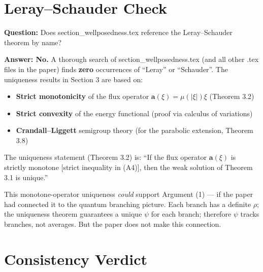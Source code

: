 \documentclass[11pt,a4paper]{article}
\begin{document}
\section{Leray--Schauder Check}

\textbf{Question:} Does section\_wellposedness.tex reference the
Leray--Schauder theorem by name?

\textbf{Answer: No.} A thorough search of section\_wellposedness.tex
(and all other .tex files in the paper) finds \textbf{zero} occurrences
of ``Leray'' or ``Schauder''. The uniqueness results in Section 3 are
based on:
\begin{itemize}
\item \textbf{Strict monotonicity} of the flux operator
$\mathbf{a}(\xi) = \mu(|\xi|)\xi$ (Theorem 3.2)
\item \textbf{Strict convexity} of the energy functional (proof via
calculus of variations)
\item \textbf{Crandall--Liggett} semigroup theory (for the parabolic
extension, Theorem 3.8)
\end{itemize}

The uniqueness statement (Theorem 3.2) is: ``If the flux operator
$\mathbf{a}(\xi)$ is strictly monotone [strict inequality in (A4)],
then the weak solution of Theorem 3.1 is unique.''

This monotone-operator uniqueness \emph{could} support Argument (1)
--- if the paper had connected it to the quantum branching picture.
Each branch has a definite $\rho$; the uniqueness theorem guarantees
a unique $\psi$ for each branch; therefore $\psi$ tracks branches, not
averages. But the paper does not make this connection.

\section{Consistency Verdict}
\end{document}
